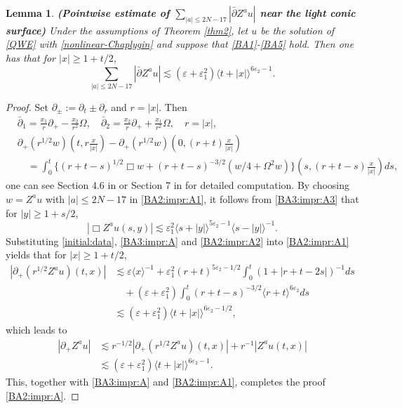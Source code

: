 \documentclass[11pt,twoside]{article}
\def\ds{\displaystyle}
\def\p{\partial}
\def\ve{\varepsilon}
\def\ls{\lesssim}
\newcommand{\w}[1]{\langle {#1} \rangle}
\theoremstyle{plain}
\newtheorem{lemma}[theorem]{Lemma}
\theoremstyle{definition}
\numberwithin{equation}{section}
\begin{document}
\begin{lemma}\label{lem:BA2:A}
{\bf (Pointwise estimate of $\ds\sum_{|a|\le2N-17}|\bar\p Z^au|$ near the light conic surface)}
Under the assumptions of Theorem \ref{thm2}, let $u$ be the solution of \eqref{QWE} with \eqref{nonlinear-Chaplygin}
and suppose that \eqref{BA1}-\eqref{BA5} hold.
Then one has that for $|x|\ge1+t/2$,
\begin{equation}\label{BA2:impr:A}
\sum_{|a|\le2N-17}|\bar\p Z^au|\ls(\ve+\ve_1^2)\w{t+|x|}^{6\ve_2-1}.
\end{equation}
\end{lemma}
\begin{proof}
Set $\p_{\pm}:=\p_t\pm\p_r$ and $r=|x|$. Then
\begin{equation}\label{BA2:impr:A1}
\begin{split}
&\bar\p_1=\frac{x_1}{r}\p_+-\frac{x_2}{r^2}\Omega,
\quad\bar\p_2=\frac{x_2}{r}\p_++\frac{x_1}{r^2}\Omega,\quad r=|x|,\\
&\p_+(r^{1/2}w)(t,r\frac{x}{|x|})-\p_+(r^{1/2}w)(0,(r+t)\frac{x}{|x|})\\
&\quad =\int_0^t\{(r+t-s)^{1/2}\Box w+(r+t-s)^{-3/2}(w/4+\Omega^2w)\}(s,(r+t-s)\frac{x}{|x|})ds,
\end{split}
\end{equation}
one can see Section 4.6 in \cite{Kubo13}
or Section 7 in \cite{HouYinYuan24} for detailed computation.
By choosing $w=Z^au$ with $|a|\le2N-17$ in \eqref{BA2:impr:A1}, it follows from \eqref{BA3:impr:A3} that for $|y|\ge1+s/2$,
\begin{equation}\label{BA2:impr:A2}
|\Box Z^au(s,y)|\ls\ve_1^2\w{s+|y|}^{5\ve_2-1}\w{s-|y|}^{-1}.
\end{equation}
Substituting \eqref{initial:data}, \eqref{BA3:impr:A} and \eqref{BA2:impr:A2} into \eqref{BA2:impr:A1} yields that for $|x|\ge1+t/2$,
\begin{equation*}
\begin{split}
|\p_+(r^{1/2}Z^au)(t,x)|&\ls\ve\w{x}^{-1}+\ve_1^2(r+t)^{5\ve_2-1/2}\int_0^t(1+|r+t-2s|)^{-1}ds\\
&\quad+(\ve+\ve_1^2)\int_0^t(r+t-s)^{-3/2}\w{r+t}^{6\ve_2}ds\\
&\ls(\ve+\ve_1^2)\w{t+|x|}^{6\ve_2-1/2},
\end{split}
\end{equation*}
which leads to
\begin{equation*}
\begin{split}
|\p_+Z^au|&\ls r^{-1/2}|\p_+(r^{1/2}Z^au)(t,x)|+r^{-1}|Z^au(t,x)|\\
&\ls(\ve+\ve_1^2)\w{t+|x|}^{6\ve_2-1}.
\end{split}
\end{equation*}
This, together with \eqref{BA3:impr:A} and \eqref{BA2:impr:A1}, completes the proof \eqref{BA2:impr:A}.
\end{proof}
\end{document}
